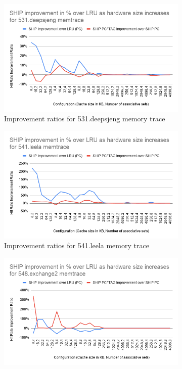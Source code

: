 \documentclass[letterpaper, 11pt]{article}
\begin{document}
	\begin{figure}[htb!]
		\centering
		\begin{subfigure}[b]{.5\linewidth}
			\includegraphics[width=\textwidth]{improvement_ratio_531_deepsjeng_memtrace.png}
			\caption{Improvement ratios for 531.deepsjeng memory trace}
			\label{fig3a}
		\end{subfigure}
		\begin{subfigure}[b]{.5\linewidth}
			\includegraphics[width=\textwidth]{improvement_ratio_541_leela_memtrace.png}
			\caption{Improvement ratios for 541.leela memory trace}
			\label{fig3b}
		\end{subfigure}
		\begin{subfigure}[b]{.5\linewidth}
			\includegraphics[width=\textwidth]{improvement_ratio_548_exchange2_memtrace.png}

\end{subfigure}
\end{figure}
\end{document}
